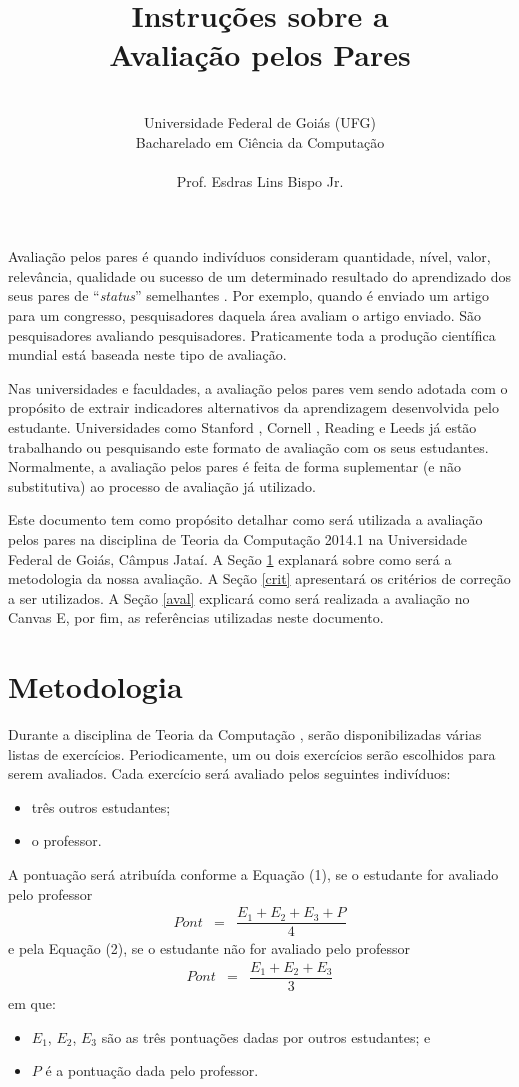 \documentclass[12pt,a4paper,oneside]{article}
\author{\\Universidade Federal de Goiás (UFG) \\Bacharelado em Ciência da Computação 
\\ \curso \sem \\Prof. Esdras Lins Bispo Jr.}
\title{\sc \huge Instruções sobre a \\Avaliação pelos Pares}
\newcommand{\tc}{Teoria da Computação }
\newcommand{\curso}{\tc}
\newcommand{\sem}{2014.1 }
\begin{document}
\maketitle

Avaliação pelos pares é quando indivíduos consideram quantidade, nível, valor, relevância, qualidade ou sucesso de um determinado resultado do aprendizado dos seus pares de ``{\it status}'' semelhantes \cite{topping}. Por exemplo, quando é enviado um artigo para um congresso, pesquisadores daquela área avaliam o artigo enviado. São pesquisadores avaliando pesquisadores. Praticamente toda a produção científica mundial está baseada neste tipo de avaliação.

Nas universidades e faculdades, a avaliação pelos pares vem sendo adotada com o propósito de extrair indicadores alternativos da aprendizagem desenvolvida pelo estudante. Universidades como Stanford \cite{stanford}, Cornell \cite{cornell}, Reading \cite{reading} e Leeds \cite{orsmond} já estão trabalhando ou pesquisando este formato de avaliação com os seus estudantes. Normalmente, a avaliação pelos pares é feita de forma suplementar (e não substitutiva) ao processo de avaliação já utilizado.

Este documento tem como propósito detalhar como será utilizada a avaliação pelos pares na disciplina de \curso \sem na Universidade Federal de Goiás, Câmpus Jataí. A Seção \ref{met} explanará sobre como será a metodologia da nossa avaliação. A Seção \ref{crit} apresentará os critérios de correção a ser utilizados. A Seção \ref{aval} explicará como será realizada a avaliação no {\sf Canvas} E, por fim, as referências utilizadas neste documento.

\section{Metodologia} \label{met}

Durante a disciplina de \curso, serão disponibilizadas várias listas de exercícios. Periodicamente, um ou dois exercícios serão escolhidos para serem avaliados. Cada exercício será avaliado pelos seguintes indivíduos:

	\begin{itemize}
		\item três outros estudantes;
		\item o professor.
	\end{itemize}

A pontuação será atribuída conforme a Equação (1), se o estudante for avaliado pelo professor
\begin{eqnarray}
	Pont & = & \dfrac{E_1 + E_2 + E_3 + P}{4}
\end{eqnarray}
e pela Equação (2), se o estudante não for avaliado pelo professor
\begin{eqnarray}
	Pont & = & \dfrac{E_1 + E_2 + E_3}{3}
\end{eqnarray}
em que:
\begin{itemize}
	\item $E_1$, $E_2$, $E_3$ são as três pontuações dadas por outros estudantes; e
	\item $P$ é a pontuação dada pelo professor.
\end{itemize}
\end{document}
